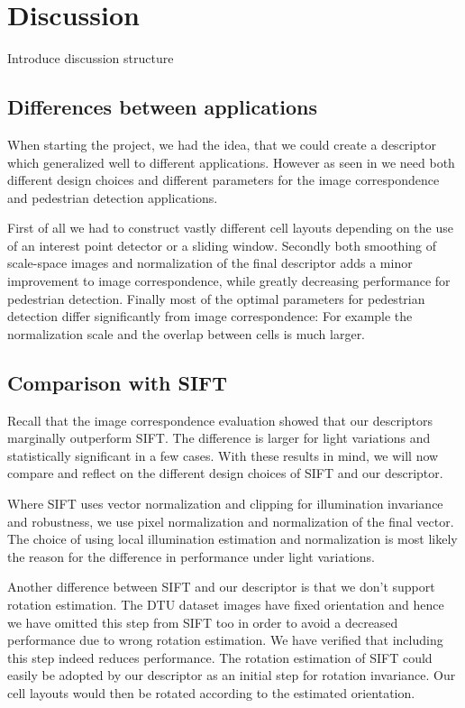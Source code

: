 \documentclass[thesis.tex]{subfiles}
\begin{document}
\chapter{Discussion}

Introduce discussion structure

\section{Differences between applications}
When starting the project, we had the idea, that we could create a descriptor which generalized well to different applications. However as seen in  we need both different design choices and different parameters for the image correspondence and pedestrian detection applications.

First of all we had to construct vastly different cell layouts depending on the use of an interest point detector or a sliding window. Secondly both smoothing of scale-space images and normalization of the final descriptor adds a minor improvement to image correspondence, while greatly decreasing performance for pedestrian detection. Finally most of the optimal parameters for pedestrian detection differ significantly from image correspondence: For example the normalization scale and the overlap between cells is much larger.
		
\section{Comparison with SIFT}
Recall that the image correspondence evaluation showed that our descriptors marginally outperform SIFT. The difference is larger for light variations and statistically significant in a few cases. With these results in mind, we will now compare and reflect on the different design choices of SIFT and our descriptor.

Where SIFT uses vector normalization and clipping for illumination invariance and robustness, we use pixel normalization and normalization of the final vector. The choice of using local illumination estimation and normalization is most likely the reason for the difference in performance under light variations.

Another difference between SIFT and our descriptor is that we don't support rotation estimation. The DTU dataset images have fixed orientation and hence we have omitted this step from SIFT too in order to avoid a decreased performance due to wrong rotation estimation. We have verified that including this step indeed reduces performance. The rotation estimation of SIFT could easily be adopted by our descriptor as an initial step for rotation invariance. Our cell layouts would then be rotated according to the estimated orientation.
\end{document}
